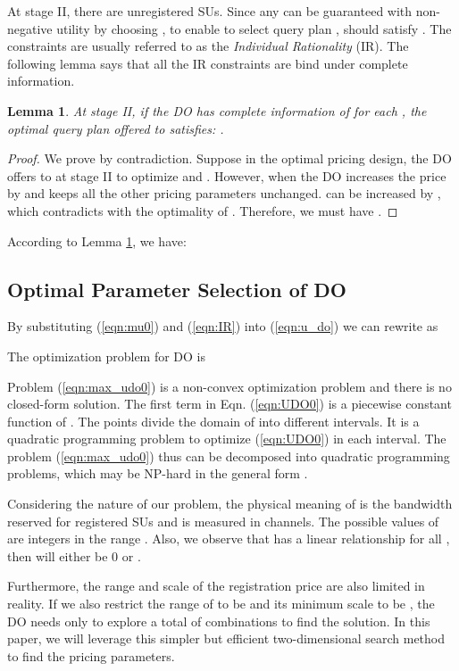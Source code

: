 \documentclass[journal]{IEEEtran}
\newtheorem{lemma}[theorem]{Lemma}
\begin{document}
At stage II, there are  unregistered SUs. Since any  can be guaranteed with non-negative utility by choosing , to enable  to select query plan ,  should satisfy .
The constraints are usually referred to as the \emph{Individual Rationality} (IR).
The following lemma says that all the IR constraints are bind under complete information.
\begin{lemma}
\label{lemma:IR_complete}
At stage II, if the DO has complete information of  for each , the optimal query plan  offered to  satisfies: .
\end{lemma}
\begin{proof}
We prove by contradiction. Suppose in the optimal pricing design, the DO offers  to  at stage II to optimize  and . However, when the DO increases the price  by  and keeps all the other pricing parameters unchanged.  can be increased by , which contradicts with the optimality of . Therefore, we must have .
\end{proof}
According to Lemma \ref{lemma:IR_complete}, we have:


\subsection{Optimal Parameter Selection of DO}

By substituting (\ref{eqn:mu0}) and (\ref{eqn:IR}) into (\ref{eqn:u_do}) we can rewrite  as


The optimization problem for DO is


Problem (\ref{eqn:max_udo0}) is a non-convex optimization problem and there is no closed-form solution.
The first term  in Eqn. (\ref{eqn:UDO0}) is a piecewise constant function of . The  points  divide the domain of  into  different intervals. It is a quadratic programming problem to optimize (\ref{eqn:UDO0}) in each interval. The problem (\ref{eqn:max_udo0}) thus can be decomposed into  quadratic programming problems, which may be NP-hard in the general form \cite{nonlinear}.

Considering the nature of our problem, the physical meaning of  is the bandwidth reserved for registered SUs and  is measured in channels. The possible values of  are integers in the range . Also, we observe that  has a linear relationship for all , then  will either be 0 or .

Furthermore, the range and scale of the registration price  are also limited in reality. If we also restrict the range of  to be  and its minimum scale to be , the DO needs only to explore a total of  combinations to find the solution.
In this paper, we will leverage this simpler but efficient two-dimensional search method to find the pricing parameters.
\end{document}
